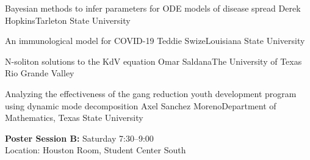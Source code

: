 \begin{postersPU}
\item\poster %
{Bayesian methods to infer parameters for ODE models of disease spread}
{Derek Hopkins}{Tarleton State University}

\item\poster %
{An immunological model for COVID-19}
{Teddie Swize}{Louisiana State University}
\item\poster %
{N-soliton solutions to the KdV equation}
{Omar Saldana}{The University of Texas Rio Grande Valley}

\item\poster %
{Analyzing the effectiveness of the gang reduction youth development program using dynamic mode decomposition}
{Axel Sanchez Moreno}{Department of Mathematics, Texas State University}

\end{postersPU}


\newpage
\begin{center}
{\large {\bf Poster Session B:} Saturday 7:30--9:00\\
Location: Houston Room, Student Center South}
\end{center}

